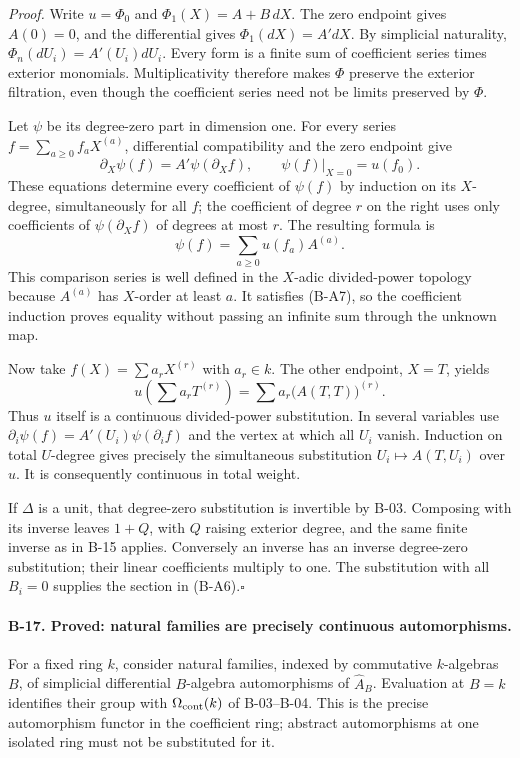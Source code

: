 \emph{Proof.}
Write $u=\Phi_0$ and $\Phi_1(X)=A+B\,dX$. The zero endpoint gives
$A(0)=0$, and the differential gives $\Phi_1(dX)=A' dX$.
By simplicial naturality, $\Phi_n(dU_i)=A'(U_i)dU_i$. Every form is
a finite sum of coefficient series times exterior monomials.
Multiplicativity therefore makes $\Phi$ preserve the exterior
filtration, even though the coefficient series need not be limits
preserved by $\Phi$.

Let $\psi$ be its degree-zero part in dimension one. For every
series $f=\sum_{a\geq0}f_a X^{(a)}$, differential compatibility and
the zero endpoint give
\[
 \partial_X\psi(f)=A'\psi(\partial_X f),\qquad
 \psi(f)|_{X=0}=u(f_0).
 \tag{B-A7}
\]
These equations determine every coefficient of $\psi(f)$ by
induction on its $X$-degree, simultaneously for all $f$; the
coefficient of degree $r$ on the right uses only coefficients of
$\psi(\partial_X f)$ of degrees at most $r$. The resulting formula is
\[
 \psi(f)=\sum_{a\geq0}u(f_a)A^{(a)}.
 \tag{B-A8}
\]
This comparison series is well defined in the $X$-adic divided-power
topology because $A^{(a)}$ has $X$-order at least $a$. It satisfies
(B-A7), so the coefficient induction proves equality without
passing an infinite sum through the unknown map.

Now take $f(X)=\sum a_rX^{(r)}$ with $a_r\in k$. The other endpoint,
$X=T$, yields
\[
 u\left(\sum a_rT^{(r)}\right)
     =\sum a_r\bigl(A(T,T)\bigr)^{(r)}.
 \tag{B-A9}
\]
Thus $u$ itself is a continuous divided-power substitution. In
several variables use
$\partial_i\psi(f)=A'(U_i)\psi(\partial_i f)$ and the vertex at
which all $U_i$ vanish. Induction on total $U$-degree gives precisely
the simultaneous substitution $U_i\mapsto A(T,U_i)$ over $u$.
It is consequently continuous in total weight.

If $\Delta$ is a unit, that degree-zero substitution is invertible
by B-03. Composing with its inverse leaves $1+Q$, with $Q$ raising
exterior degree, and the same finite inverse as in B-15 applies.
Conversely an inverse has an inverse degree-zero substitution;
their linear coefficients multiply to one. The substitution with
all $B_i=0$ supplies the section in (B-A6).\hfill$\square$

\paragraph{B-17. Proved: natural families are precisely continuous automorphisms.}
For a fixed ring $k$, consider natural families, indexed by
commutative $k$-algebras $B$, of simplicial differential
$B$-algebra automorphisms of $\widehat A_B$. Evaluation at $B=k$
identifies their group with $\Omega_{\rm cont}(k)$ of B-03--B-04.
This is the precise automorphism functor in the coefficient ring;
abstract automorphisms at one isolated ring must not be substituted
for it.

